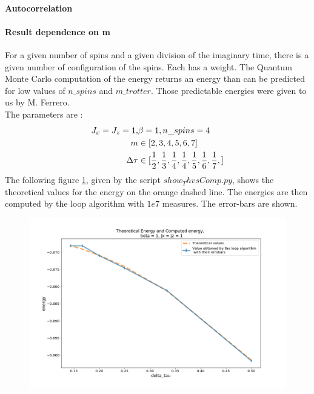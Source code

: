 \documentclass[a4paper,12pt,twoside]{article}
\begin{document}
	\paragraph{Autocorrelation}
	
	\paragraph{Result dependence on m}
	For a given number of spins and a given division of the imaginary time, there is a given number of configuration of the spins. Each has a weight. The Quantum Monte Carlo computation of the energy returns an energy than can be predicted for low values of $n\_spins$ and $m\_trotter$. Those predictable energies were given to us by M. Ferrero. \\ The parameters are :
	\begin{equation}
		\centering
		\begin{split}
			J_x = J_z = 1, & \beta = 1, n\_spins = 4 \\
			m & \in [2, 3, 4, 5, 6, 7] \\
			\Delta\tau & \in [\frac{1}{2}, \frac{1}{3}, \frac{1}{4}, \frac{1}{4}, \frac{1}{5}, \frac{1}{6}, \frac{1}{7}, ]
		\end{split}
	\end{equation}
	The following figure \ref{varymx=y}, given by the script $show_ThvsComp.py$, shows the theoretical values for the energy on the orange dashed line. The energies are then computed by the loop algorithm with $1e7$ measures. The error-bars are shown.
	\begin{figure}[!h]
		\centering
		\includegraphics[width=15cm]{ThvsComp_x=z=1_m2-8.png}
		\label{varymx=y}
	\end{figure}
	
\end{document}

